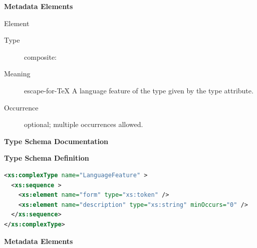\documentclass{ivoa}
\begin{document}
\vspace{0.5ex}\noindent\textbf{ Metadata Elements}

\begingroup\small\begin{bigdescription}\item[Element \xmlel{feature}]
\begin{description}
\item[Type] composite: 
\item[Meaning] escape-for-TeX{{{
            A language feature of the type given by the
            type attribute.
          }}}
\item[Occurrence] optional; multiple occurrences allowed.

\end{description}


\end{bigdescription}\endgroup

\endgroup

\begingroup
      	\renewcommand*\descriptionlabel[1]{%
      	\hbox to 5.5em{\emph{#1}\hfil}}\vspace{2ex}\noindent\textbf{ Type Schema Documentation}


\vspace{1ex}\noindent\textbf{ Type Schema Definition}

\begin{lstlisting}[language=XML,basicstyle=\footnotesize]
<xs:complexType name="LanguageFeature" >
  <xs:sequence >
    <xs:element name="form" type="xs:token" />
    <xs:element name="description" type="xs:string" minOccurs="0" />
  </xs:sequence>
</xs:complexType>
\end{lstlisting}

\vspace{0.5ex}\noindent\textbf{ Metadata Elements}
\end{document}
